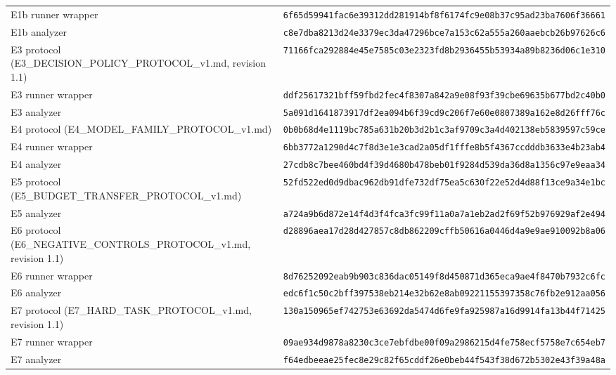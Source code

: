 \documentclass[11pt,a4paper]{article}
\begin{document}
\begin{center}
{\begin{tabular}{ll}
E1b runner wrapper & \texttt{6f65d59941fac6e39312dd281914bf8f6174fc9e08b37c95ad23ba7606f36661} \\
E1b analyzer & \texttt{c8e7dba8213d24e3379ec3da47296bce7a153c62a555a260aaebcb26b97626c6} \\
E3 protocol (E3\_DECISION\_POLICY\_PROTOCOL\_v1.md, revision 1.1) & \texttt{71166fca292884e45e7585c03e2323fd8b2936455b53934a89b8236d06c1e310} \\
E3 runner wrapper & \texttt{ddf25617321bff59fbd2fec4f8307a842a9e08f93f39cbe69635b677bd2c40b0} \\
E3 analyzer & \texttt{5a091d1641873917df2ea094b6f39cd9c206f7e60e0807389a162e8d26fff76c} \\
E4 protocol (E4\_MODEL\_FAMILY\_PROTOCOL\_v1.md) & \texttt{0b0b68d4e1119bc785a631b20b3d2b1c3af9709c3a4d402138eb5839597c59ce} \\
E4 runner wrapper & \texttt{6bb3772a1290d4c7f8d3e1e3cad2a05df1fffe8b5f4367ccdddb3633e4b23ab4} \\
E4 analyzer & \texttt{27cdb8c7bee460bd4f39d4680b478beb01f9284d539da36d8a1356c97e9eaa34} \\
E5 protocol (E5\_BUDGET\_TRANSFER\_PROTOCOL\_v1.md) & \texttt{52fd522ed0d9dbac962db91dfe732df75ea5c630f22e52d4d88f13ce9a34e1bc} \\
E5 analyzer & \texttt{a724a9b6d872e14f4d3f4fca3fc99f11a0a7a1eb2ad2f69f52b976929af2e494} \\
E6 protocol (E6\_NEGATIVE\_CONTROLS\_PROTOCOL\_v1.md, revision 1.1) & \texttt{d28896aea17d28d427857c8db862209cffb50616a0446d4a9e9ae910092b8a06} \\
E6 runner wrapper & \texttt{8d76252092eab9b903c836dac05149f8d450871d365eca9ae4f8470b7932c6fc} \\
E6 analyzer & \texttt{edc6f1c50c2bff397538eb214e32b62e8ab09221155397358c76fb2e912aa056} \\
E7 protocol (E7\_HARD\_TASK\_PROTOCOL\_v1.md, revision 1.1) & \texttt{130a150965ef742753e63692da5474d6fe9fa925987a16d9914fa13b44f71425} \\
E7 runner wrapper & \texttt{09ae934d9878a8230c3ce7ebfdbe00f09a2986215d4fe758ecf5758e7c654eb7} \\
E7 analyzer & \texttt{f64edbeeae25fec8e29c82f65cddf26e0beb44f543f38d672b5302e43f39a48a} \\
\bottomrule
\end{tabular}}
\end{center}
\end{document}
